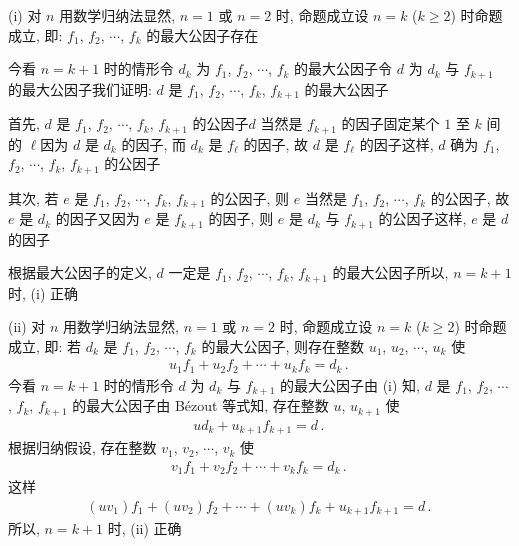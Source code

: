 \begin{pf}
    (i) 对 $n$ 用数学归纳法\period 显然, $n = 1$ 或 $n = 2$ 时, 命题成立\period 设 $n = k$ ($k \geq 2$) 时命题成立, 即: $f_1$, $f_2$, $\cdots$, $f_k$ 的最大公因子存在\period

    今看 $n = k+1$ 时的情形\period 令 $d_k$ 为 $f_1$, $f_2$, $\cdots$, $f_k$ 的最大公因子\period 令 $d$ 为 $d_k$ 与 $f_{k+1}$ 的最大公因子\period 我们证明: $d$ 是 $f_1$, $f_2$, $\cdots$, $f_k$, $f_{k+1}$ 的最大公因子\period

    首先, $d$ 是 $f_1$, $f_2$, $\cdots$, $f_k$, $f_{k+1}$ 的公因子\period $d$ 当然是 $f_{k+1}$ 的因子\period 固定某个 $1$ 至 $k$ 间的 $\ell$\period 因为 $d$ 是 $d_k$ 的因子, 而 $d_k$ 是 $f_{\ell}$ 的因子, 故 $d$ 是 $f_{\ell}$ 的因子\period 这样, $d$ 确为 $f_1$, $f_2$, $\cdots$, $f_k$, $f_{k+1}$ 的公因子\period

    其次, 若 $e$ 是 $f_1$, $f_2$, $\cdots$, $f_k$, $f_{k+1}$ 的公因子, 则 $e$ 当然是 $f_1$, $f_2$, $\cdots$, $f_{k}$ 的公因子, 故 $e$ 是 $d_k$ 的因子\period 又因为 $e$ 是 $f_{k+1}$ 的因子, 则 $e$ 是 $d_k$ 与 $f_{k+1}$ 的公因子\period 这样, $e$ 是 $d$ 的因子\period

    根据最大公因子的定义, $d$ 一定是 $f_1$, $f_2$, $\cdots$, $f_k$, $f_{k+1}$ 的最大公因子\period 所以, $n = k+1$ 时, (i) 正确\period

    (ii) 对 $n$ 用数学归纳法\period 显然, $n = 1$ 或 $n = 2$ 时, 命题成立\period 设 $n = k$ ($k \geq 2$) 时命题成立, 即: 若 $d_k$ 是 $f_1$, $f_2$, $\cdots$, $f_k$ 的最大公因子, 则存在整数 $u_1$, $u_2$, $\cdots$, $u_k$ 使
    \begin{align*}
        u_1 f_1 + u_2 f_2 + \cdots + u_k f_k = d_k \period
    \end{align*}
    今看 $n = k+1$ 时的情形\period 令 $d$ 为 $d_k$ 与 $f_{k+1}$ 的最大公因子\period 由 (i) 知, $d$ 是 $f_1$, $f_2$, $\cdots$, $f_k$, $f_{k+1}$ 的最大公因子\period 由 Bézout 等式知, 存在整数 $u$, $u_{k+1}$ 使
    \begin{align*}
        u d_k + u_{k+1} f_{k+1} = d \period
    \end{align*}
    根据归纳假设, 存在整数 $v_1$, $v_2$, $\cdots$, $v_k$ 使
    \begin{align*}
        v_1 f_1 + v_2 f_2 + \cdots + v_k f_k = d_k \period
    \end{align*}
    这样
    \begin{align*}
        (uv_1) f_1 + (uv_2) f_2 + \cdots + (uv_k) f_k + u_{k+1} f_{k+1} = d \period
    \end{align*}
    所以, $n = k+1$ 时, (ii) 正确\period
\end{pf}

